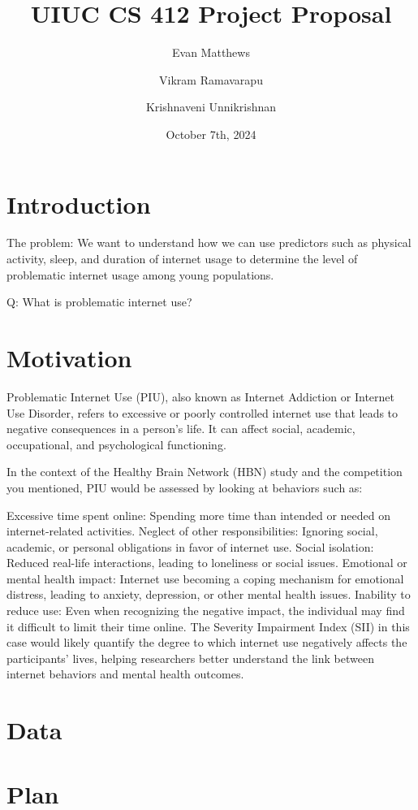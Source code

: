 \documentclass[12pt]{extarticle}
\title{UIUC CS 412 Project Proposal}
\author[1]{Evan Matthews}
\author[1]{Vikram Ramavarapu}
\author[1]{Krishnaveni Unnikrishnan}
\affil[1]{Siebel School of Computing and Data Science}
\date{October 7th, 2024}
\begin{document}
\maketitle

\section{Introduction}

The problem: We want to understand how we can use predictors such as physical activity, sleep, and duration of internet usage to determine the level of problematic internet usage among young populations.

Q: What is problematic internet use? 

\section{Motivation}

Problematic Internet Use (PIU), also known as Internet Addiction or Internet Use Disorder, refers to excessive or poorly controlled internet use that leads to negative consequences in a person's life. 
It can affect social, academic, occupational, and psychological functioning.\cite{child-mind-institute-problematic-internet-use}

In the context of the Healthy Brain Network (HBN) study and the competition you mentioned, PIU would be assessed by looking at behaviors such as:

Excessive time spent online: Spending more time than intended or needed on internet-related activities.
Neglect of other responsibilities: Ignoring social, academic, or personal obligations in favor of internet use.
Social isolation: Reduced real-life interactions, leading to loneliness or social issues.
Emotional or mental health impact: Internet use becoming a coping mechanism for emotional distress, leading to anxiety, depression, or other mental health issues.
Inability to reduce use: Even when recognizing the negative impact, the individual may find it difficult to limit their time online.
The Severity Impairment Index (SII) in this case would likely quantify the degree to which internet use negatively affects the participants' lives, helping researchers better understand the link between internet behaviors and mental health outcomes.

\section{Data}

\section{Plan}



\end{document}
